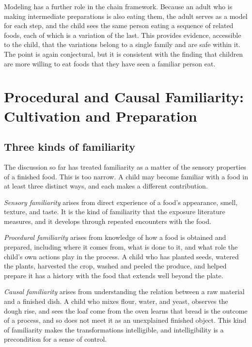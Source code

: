 \documentclass[11pt]{article}
\theoremstyle{remark}
\begin{document}
Modeling has a further role in the chain framework. Because an adult who is making intermediate preparations is also eating them, the adult serves as a model for each step, and the child sees the same person eating a sequence of related foods, each of which is a variation of the last. This provides evidence, accessible to the child, that the variations belong to a single family and are safe within it. The point is again conjectural, but it is consistent with the finding that children are more willing to eat foods that they have seen a familiar person eat.

\section{Procedural and Causal Familiarity: Cultivation and Preparation}\label{sec:procedural}

\subsection{Three kinds of familiarity}

The discussion so far has treated familiarity as a matter of the sensory properties of a finished food. This is too narrow. A child may become familiar with a food in at least three distinct ways, and each makes a different contribution.

\emph{Sensory familiarity} arises from direct experience of a food's appearance, smell, texture, and taste. It is the kind of familiarity that the exposure literature measures, and it develops through repeated encounters with the food.

\emph{Procedural familiarity} arises from knowledge of how a food is obtained and prepared, including where it comes from, what is done to it, and what role the child's own actions play in the process. A child who has planted seeds, watered the plants, harvested the crop, washed and peeled the produce, and helped prepare it has a history with the food that extends well beyond the plate.

\emph{Causal familiarity} arises from understanding the relation between a raw material and a finished dish. A child who mixes flour, water, and yeast, observes the dough rise, and sees the loaf come from the oven learns that bread is the outcome of a process, and so does not meet it as an unexplained finished object. This kind of familiarity makes the transformations intelligible, and intelligibility is a precondition for a sense of control.
\end{document}
